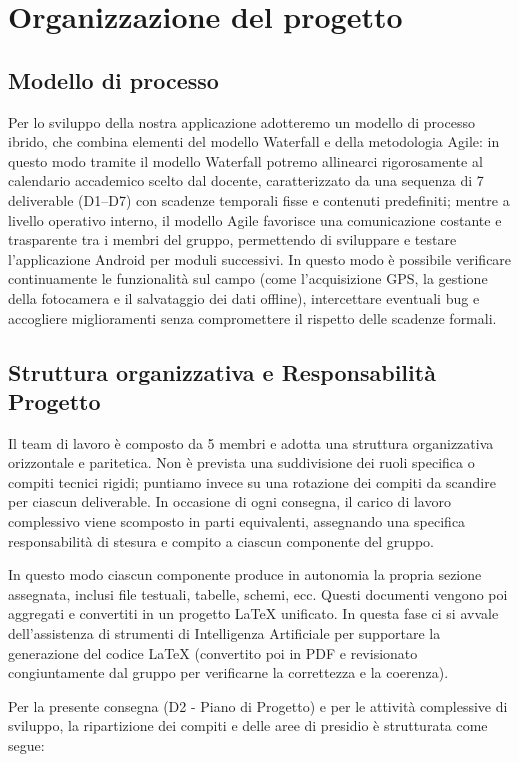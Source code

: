 \section{Organizzazione del progetto}

\subsection{Modello di processo}
Per lo sviluppo della nostra applicazione adotteremo un modello di processo ibrido, che combina elementi del modello Waterfall e della metodologia Agile: in questo modo tramite il modello Waterfall potremo allinearci rigorosamente al calendario accademico scelto dal docente, caratterizzato da una sequenza di 7 deliverable (D1--D7) con scadenze temporali fisse e contenuti predefiniti; mentre a livello operativo interno, il modello Agile favorisce una comunicazione costante e trasparente tra i membri del gruppo, permettendo di sviluppare e testare l'applicazione Android per moduli successivi. In questo modo è possibile verificare continuamente le funzionalità sul campo (come l'acquisizione GPS, la gestione della fotocamera e il salvataggio dei dati offline), intercettare eventuali bug e accogliere miglioramenti senza compromettere il rispetto delle scadenze formali.

\subsection{Struttura organizzativa e Responsabilità Progetto}
Il team di lavoro è composto da 5 membri e adotta una struttura organizzativa orizzontale e paritetica. Non è prevista una suddivisione dei ruoli specifica o compiti tecnici rigidi; puntiamo invece su una rotazione dei compiti da scandire per ciascun deliverable. In occasione di ogni consegna, il carico di lavoro complessivo viene scomposto in parti equivalenti, assegnando una specifica responsabilità di stesura e compito a ciascun componente del gruppo.

In questo modo ciascun componente produce in autonomia la propria sezione assegnata, inclusi file testuali, tabelle, schemi, ecc. Questi documenti vengono poi aggregati e convertiti in un progetto LaTeX unificato. In questa fase ci si avvale dell'assistenza di strumenti di Intelligenza Artificiale per supportare la generazione del codice LaTeX (convertito poi in PDF e revisionato congiuntamente dal gruppo per verificarne la correttezza e la coerenza).

Per la presente consegna (D2 - Piano di Progetto) e per le attività complessive di sviluppo, la ripartizione dei compiti e delle aree di presidio è strutturata come segue:


